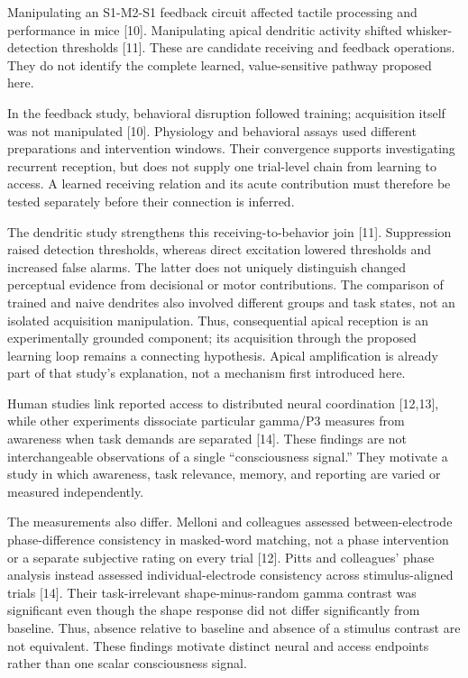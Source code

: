 \documentclass[
  american,
  11pt,
  letterpaper,
]{article}
\begin{document}
Manipulating an S1-M2-S1 feedback circuit affected tactile processing and performance in mice {[}10{]}. Manipulating apical dendritic activity shifted whisker-detection thresholds {[}11{]}. These are candidate receiving and feedback operations. They do not identify the complete learned, value-sensitive pathway proposed here.

In the feedback study, behavioral disruption followed training; acquisition itself was not manipulated {[}10{]}. Physiology and behavioral assays used different preparations and intervention windows. Their convergence supports investigating recurrent reception, but does not supply one trial-level chain from learning to access. A learned receiving relation and its acute contribution must therefore be tested separately before their connection is inferred.

The dendritic study strengthens this receiving-to-behavior join {[}11{]}. Suppression raised detection thresholds, whereas direct excitation lowered thresholds and increased false alarms. The latter does not uniquely distinguish changed perceptual evidence from decisional or motor contributions. The comparison of trained and naive dendrites also involved different groups and task states, not an isolated acquisition manipulation. Thus, consequential apical reception is an experimentally grounded component; its acquisition through the proposed learning loop remains a connecting hypothesis. Apical amplification is already part of that study's explanation, not a mechanism first introduced here.

Human studies link reported access to distributed neural coordination {[}12,13{]}, while other experiments dissociate particular gamma/P3 measures from awareness when task demands are separated {[}14{]}. These findings are not interchangeable observations of a single ``consciousness signal.'' They motivate a study in which awareness, task relevance, memory, and reporting are varied or measured independently.

The measurements also differ. Melloni and colleagues assessed between-electrode phase-difference consistency in masked-word matching, not a phase intervention or a separate subjective rating on every trial {[}12{]}. Pitts and colleagues' phase analysis instead assessed individual-electrode consistency across stimulus-aligned trials {[}14{]}. Their task-irrelevant shape-minus-random gamma contrast was significant even though the shape response did not differ significantly from baseline. Thus, absence relative to baseline and absence of a stimulus contrast are not equivalent. These findings motivate distinct neural and access endpoints rather than one scalar consciousness signal.
\end{document}
